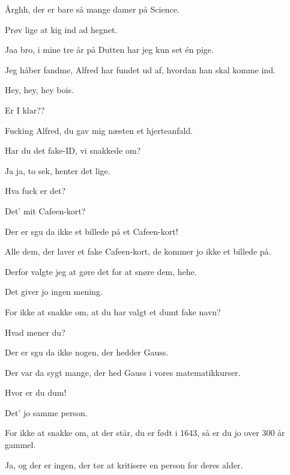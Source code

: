 \documentclass[a4paper,11pt]{article}
\begin{document}
\begin{sketch}


 Årghh, der er bare så mange damer på Science.

 Prøv lige at kig ind ad hegnet.


 Jaa bro, i mine tre år på Dutten har jeg kun set én pige.

 Jeg håber fandme, Alfred har fundet ud af, hvordan han skal komme ind.

 Hey, hey, hey bois.

 Er I klar??

 Fucking Alfred, du gav mig næsten et hjerteanfald.

 Har du det fake-ID, vi snakkede om?

 Ja ja, to sek, henter det lige.


 Hva fuck er det?

 Det' mit Cafeen-kort?

 Der er sgu da ikke et billede på et Cafeen-kort!

 Alle dem, der laver et fake Cafeen-kort, de kommer jo ikke et billede på.

 Derfor valgte jeg at gøre det for at snøre dem, hehe.

 Det giver jo ingen mening.

 For ikke at snakke om, at du har valgt et dumt fake navn?

 Hvad mener du?

 Der er sgu da ikke nogen, der hedder Gauss.

 Der var da sygt mange, der hed Gauss i vores matematikkurser.

 Hvor er du dum!

 Det' jo samme person.

 For ikke at snakke om, at der står, du er født i 1643, så er du jo over 300 år gammel.

 Ja, og der er ingen, der tør at kritisere en person for deres alder.


\end{sketch}
\end{document}
